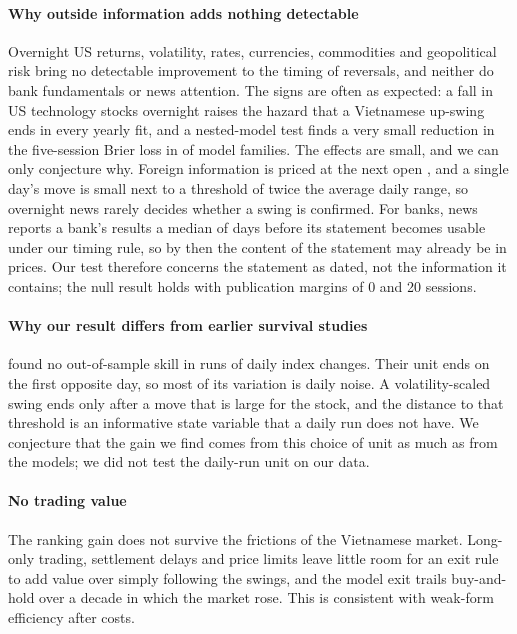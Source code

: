 \paragraph{Why outside information adds nothing detectable} Overnight US returns, volatility, rates,
currencies, commodities and geopolitical risk bring no detectable improvement to the timing of
reversals, and neither do bank fundamentals or news attention. The signs are often as expected: a
fall in US technology stocks overnight raises the hazard that a Vietnamese up-swing ends in every
yearly fit, and a nested-model test finds a very small reduction in the five-session Brier loss in
\CWBlockDBelow{} of \CWBlockDCount{} model families.
The effects are small, and we can only conjecture why. Foreign information is priced at the next
open \citep{HamaoMasulisNg1990}, and a single day's move is small next to a threshold of twice the
average daily range, so overnight news rarely decides whether a swing is confirmed. For banks, news
reports a bank's results a median of \BlockENewsLeadDays{} days before its statement becomes usable
under our timing rule, so by then the content of the statement may already be in prices. Our test
therefore concerns the statement as dated, not the information it contains; the null result holds
with publication margins of 0 and 20 sessions.

\paragraph{Why our result differs from earlier survival studies} \citet{Yao2005} found no
out-of-sample skill in runs of daily index changes. Their unit ends on the first opposite day, so
most of its variation is daily noise. A volatility-scaled swing ends only after a move that is large
for the stock, and the distance to that threshold is an informative state variable that a daily run
does not have. We conjecture that the gain we find comes from this choice of unit as much as from
the models; we did not test the daily-run unit on our data.

\paragraph{No trading value} The ranking gain does not survive the frictions of the Vietnamese
market. Long-only trading, settlement delays and price limits leave little room for an exit rule to
add value over simply following the swings, and the model exit trails buy-and-hold over a decade in
which the market rose. This is consistent with weak-form efficiency after costs.

